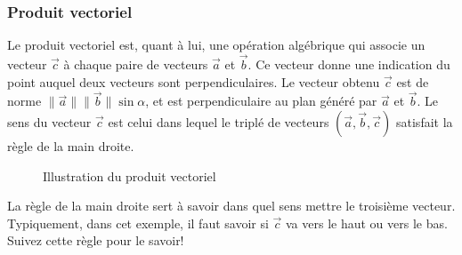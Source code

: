 \documentclass{article}
\begin{document}
\subsubsection{Produit vectoriel} Le produit vectoriel est, quant à lui, une opération algébrique qui associe un vecteur $\vec{c}$ à chaque paire de vecteurs $\vec{a}$ et $\vec{b}$. Ce vecteur donne une indication du point auquel deux vecteurs sont perpendiculaires. 
Le vecteur obtenu $\vec{c}$ est de norme $\lVert \vec{a} \rVert \lVert \vec{b} \rVert \sin{\alpha}$, et est perpendiculaire au plan généré par $\vec{a}$ et $\vec{b}$. Le sens du vecteur $\vec{c}$ est celui dans lequel le triplé de vecteurs $(\vec{a}, \vec{b}, \vec{c})$ satisfait la règle de la main droite.

\begin{figure}[ht]

\begin{center}
\end{center}

\caption{Illustration du produit vectoriel}
    \label{fig:produitvec}
\end{figure}

La règle de la main droite sert à savoir dans quel sens mettre le troisième vecteur. Typiquement, dans cet exemple, il faut savoir si $\vec{c}$ va vers le haut ou vers le bas. Suivez cette règle pour le savoir!
\end{document}
